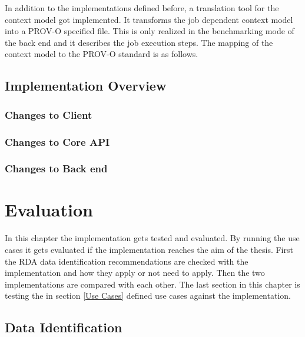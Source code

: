 \documentclass[draft,final]{vutinfth} %
\begin{document}

In addition to the implementations defined before, a translation tool for the context model got implemented. It transforms the job dependent context model into a PROV-O specified file. This is only realized in the benchmarking mode of the back end and it describes the job execution steps. The mapping of the context model to the PROV-O standard is as follows.


\section{Implementation Overview}\label{Implementation Overview}

\subsection{Changes to Client}
\subsection{Changes to Core API}
\subsection{Changes to Back end}

\chapter{Evaluation}\label{Evaluation}
In this chapter the implementation gets tested and evaluated. By running the use cases it gets evaluated if the implementation reaches the aim of the thesis. First the RDA data identification recommendations are checked with the implementation and how they apply or not need to apply. Then the two implementations are compared with each other. The last section in this chapter is testing the in section \ref{Use Cases} defined use cases against the implementation. 

\section{Data Identification}\label{Evaluation:Data Identification}
\end{document}
